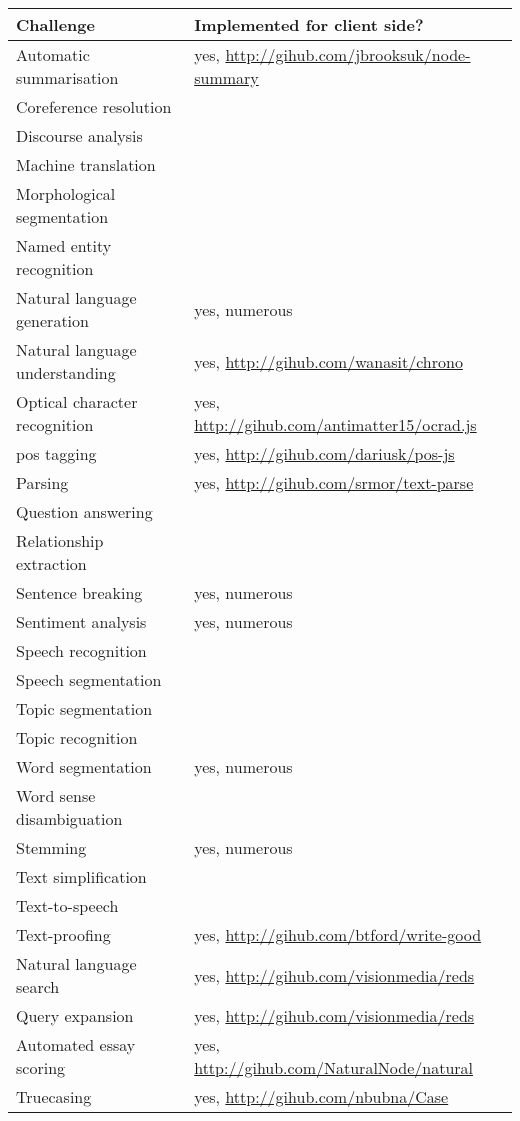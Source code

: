 {\footnotesize
\begin{tabular}{ l p{5.25cm} }
  Challenge &
  Implemented for client side?
  \\ \hline
  Automatic summarisation &{\raggedright
  yes, \url{http://gihub.com/jbrooksuk/node-summary}
  }\\
  Coreference resolution &
  \\
  Discourse analysis &
  \\
  Machine translation &
  \\
  Morphological segmentation &
  \\
  Named entity recognition &
  \\
  Natural language generation &{\raggedright
  yes, numerous
  }\\
  Natural language understanding &{\raggedright
  yes, \url{http://gihub.com/wanasit/chrono}
  }\\
  Optical character recognition &{\raggedright
  yes, \url{http://gihub.com/antimatter15/ocrad.js}
  }\\
  \gls{pos} tagging &{\raggedright
  yes, \url{http://gihub.com/dariusk/pos-js}
  }\\
  Parsing &{\raggedright
  yes, \url{http://gihub.com/srmor/text-parse}
  }\\
  Question answering &
  \\
  Relationship extraction &
  \\
  Sentence breaking &{\raggedright
  yes, numerous
  }\\
  Sentiment analysis &{\raggedright
  yes, numerous
  }\\
  Speech recognition &
  \\
  Speech segmentation &
  \\
  Topic segmentation &
  \\
  Topic recognition &
  \\
  Word segmentation &{\raggedright
  yes, numerous
  }\\
  Word sense disambiguation &
  \\
  Stemming &{\raggedright
  yes, numerous
  }\\
  Text simplification &
  \\
  Text-to-speech &
  \\
  Text-proofing &{\raggedright
  yes, \url{http://gihub.com/btford/write-good}
  }\\
  Natural language search &{\raggedright
  yes, \url{http://gihub.com/visionmedia/reds}
  }\\
  Query expansion &{\raggedright
  yes, \url{http://gihub.com/visionmedia/reds}
  }\\
  Automated essay scoring &{\raggedright
  yes, \url{http://gihub.com/NaturalNode/natural}
  }\\
  Truecasing &{\raggedright
  yes, \url{http://gihub.com/nbubna/Case}
  }\\
\end{tabular}
}

